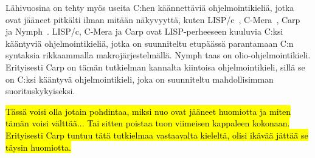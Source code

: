 Lähivuosina on tehty myös useita C:hen käännettäviä ohjelmointikieliä, jotka
ovat jääneet pitkälti ilman mitään näkyvyyttä, kuten LISP/c~\citep{clisp1},
C-Mera~\citep{clisp2}, Carp~\citep{clisp3} ja Nymph~\citep{nymph}. LISP/c,
C-Mera ja Carp ovat LISP-perheeseen kuuluvia C:ksi kääntyviä ohjelmointikieliä,
jotka on suunniteltu etupäässä parantamaan C:n syntaksia rikkaammalla
makrojärjestelmällä. Nymph taas on olio-ohjelmointikieli. Erityisesti Carp
on tämän tutkielman kannalta kiintoisa ohjelmointikieli, sillä se on C:ksi
kääntyvä ohjelmointikieli, joka on suunniteltu mahdollisimman
suorituskykyiseksi.

\hl{Tässä voisi olla jotain pohdintaa, miksi nuo ovat jääneet huomiotta ja
miten tämän voisi välttää... Tai sitten poistaa tuon viimeisen kappaleen
kokonaan. Erityisesti Carp tuntuu tätä tutkielmaa vastaavalta kieleltä,
olisi ikävää jättää se täysin huomiotta.}

